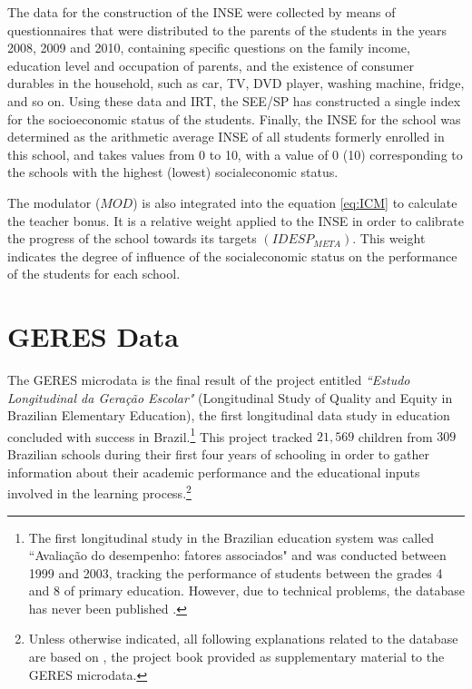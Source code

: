 \documentclass[a4paper, 12pt]{article}
\begin{document}
The data for the construction of the INSE were collected by means of questionnaires that were distributed to the parents of the students in the years 2008, 2009 and 2010, containing specific questions on the family income, education level and occupation of parents, and the existence of consumer durables in the household, such as car, TV, DVD player, washing machine, fridge, and so on. Using these data and IRT, the SEE/SP has constructed a single index for the socioeconomic status of the students. Finally, the INSE for the school was determined as the arithmetic average INSE of all students formerly enrolled in this school, and takes values from 0 to 10, with a value of 0 (10) corresponding to the schools with the highest (lowest) socialeconomic status.


The modulator ($MOD$) is also integrated into the equation \eqref{eq:ICM} to calculate the teacher bonus. It is a relative weight applied to the INSE in order to calibrate the progress of the school towards its targets $(IDESP_{META})$. This weight indicates the degree of influence of the socialeconomic status on the performance of the students for each school.




\section{GERES Data} \label{GERES}

The GERES microdata is the final result of the project entitled \textit{``Estudo Longitudinal da Geração Escolar"} (Longitudinal Study of Quality and Equity in Brazilian Elementary Education), the first longitudinal data study in education concluded with success in Brazil.\footnote{
The first longitudinal study in the Brazilian education system was called ``Avaliação do desempenho: fatores associados" and was conducted between 1999 and 2003, tracking the performance of students between the grades 4 and 8 of primary education. However, due to technical problems, the database has never been published \citep{brooke2011geres}.} This project tracked $21,569$ children from $309$ Brazilian schools during their first four years of schooling in order to gather information about their academic performance and the educational inputs involved in the learning process.\footnote{Unless otherwise indicated, all following explanations related to the database are based on \citet{brooke2011geres}, the project book provided as supplementary material to the GERES microdata.}
\end{document}
